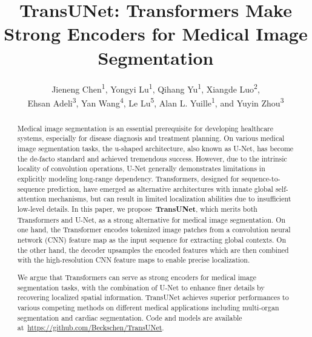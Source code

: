 \documentclass[runningheads]{llncs}
\begin{document}
%
\title{TransUNet: Transformers Make Strong Encoders for Medical Image Segmentation}
\author{Jieneng Chen\textsuperscript{1}, Yongyi Lu\textsuperscript{1}, Qihang Yu\textsuperscript{1},
Xiangde Luo\textsuperscript{2}, \\Ehsan Adeli\textsuperscript{3}, Yan Wang\textsuperscript{4}, Le Lu\textsuperscript{5}, Alan L. Yuille\textsuperscript{1}, and Yuyin Zhou\textsuperscript{3}}


%
\maketitle%
%
\begin{abstract}
Medical image segmentation is an essential prerequisite for developing healthcare systems, especially for disease diagnosis and treatment planning. 
On various medical image segmentation tasks, the u-shaped architecture, also known as U-Net, has become the de-facto standard and achieved tremendous success.
However, due to the intrinsic locality of convolution operations, U-Net generally demonstrates limitations in explicitly modeling long-range dependency.
Transformers, designed for sequence-to-sequence prediction, have emerged as alternative architectures with innate global self-attention mechanisms, but can result in limited localization abilities due to insufficient low-level details.
In this paper, we propose~\textbf{TransUNet}, which merits both Transformers and U-Net, as a strong alternative for medical image segmentation.
On one hand, the Transformer encodes tokenized image patches from a convolution neural network (CNN) feature map as the input sequence for extracting global contexts. On the other hand, the decoder upsamples the encoded features which are then combined with the high-resolution CNN feature maps to enable precise localization.

We argue that Transformers can serve as strong encoders for medical image segmentation tasks, with the combination of U-Net to enhance finer details by recovering localized spatial information. TransUNet achieves superior performances to various competing methods on different medical applications including multi-organ segmentation and cardiac segmentation. Code and models are available at~\url{https://github.com/Beckschen/TransUNet}.

\end{abstract}
\end{document}
